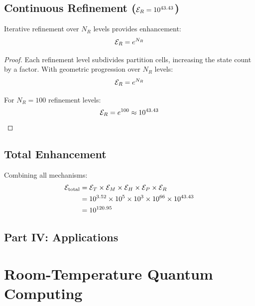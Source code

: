 \subsection{Continuous Refinement ($\mathcal{E}_R = 10^{43.43}$)}

\begin{theorem}
\label{thm:refinement}
Iterative refinement over $N_R$ levels provides enhancement:
\begin{equation}
\mathcal{E}_R = e^{N_R}
\end{equation}
\end{theorem}

\begin{proof}
Each refinement level subdivides partition cells, increasing the state count by a factor. With geometric progression over $N_R$ levels:
\begin{equation}
\mathcal{E}_R = e^{N_R}
\end{equation}

For $N_R = 100$ refinement levels:
\begin{equation}
\mathcal{E}_R = e^{100} \approx 10^{43.43}
\end{equation}
\end{proof}

\subsection{Total Enhancement}

Combining all mechanisms:
\begin{align}
\mathcal{E}_{\text{total}} &= \mathcal{E}_T \times \mathcal{E}_M \times \mathcal{E}_H \times \mathcal{E}_P \times \mathcal{E}_R \\
&= 10^{3.52} \times 10^5 \times 10^3 \times 10^{66} \times 10^{43.43} \\
&= 10^{120.95}
\label{eq:total_enhancement_value}
\end{align}


\subsection*{Part IV: Applications}

\section{Room-Temperature Quantum Computing}

